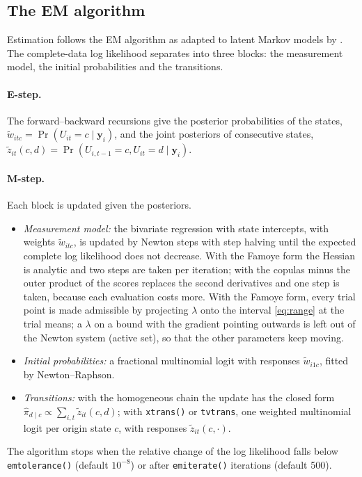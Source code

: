 \documentclass[11pt,a4paper]{article}
\newcommand{\cmd}[1]{\texttt{#1}}
\newcommand{\yv}{\mathbf y}
\begin{document}
\subsection{The EM algorithm}\label{sec:em}

Estimation follows the EM algorithm \citep{dempster1977} as adapted to latent Markov models by
\citet{bartolucci2013}. The complete-data log likelihood separates into three blocks: the measurement
model, the initial probabilities and the transitions.

\paragraph{E-step.} The forward--backward recursions give the posterior probabilities of the states,
$\tilde w_{itc}=\Pr(U_{it}=c\mid\yv_i)$, and the joint posteriors of consecutive states,
$\tilde z_{it}(c,d)=\Pr(U_{i,t-1}=c,U_{it}=d\mid\yv_i)$.

\paragraph{M-step.} Each block is updated given the posteriors.
\begin{itemize}
\item \emph{Measurement model:} the bivariate regression with state intercepts, with weights
$\tilde w_{itc}$, is updated by Newton steps with step halving until the expected complete log
likelihood does not decrease. With the Famoye form the Hessian is analytic and two steps are taken
per iteration; with the copulas minus the outer product of the scores replaces the second
derivatives and one step is taken, because each evaluation costs more. With the Famoye form, every
trial point is made admissible by projecting $\lambda$ onto the interval \eqref{eq:range} at the trial
means; a $\lambda$ on a bound with the gradient pointing outwards is left out of the Newton system
(active set), so that the other parameters keep moving.
\item \emph{Initial probabilities:} a fractional multinomial logit with responses $\tilde w_{i1c}$,
fitted by Newton--Raphson.
\item \emph{Transitions:} with the homogeneous chain the update has the closed form
$\hat\pi_{d\mid c}\propto\sum_{i,t}\tilde z_{it}(c,d)$; with \cmd{xtrans()} or \cmd{tvtrans}, one
weighted multinomial logit per origin state $c$, with responses $\tilde z_{it}(c,\cdot)$.
\end{itemize}
The algorithm stops when the relative change of the log likelihood falls below
\cmd{emtolerance()} (default $10^{-8}$) or after \cmd{emiterate()} iterations (default 500).
\end{document}
